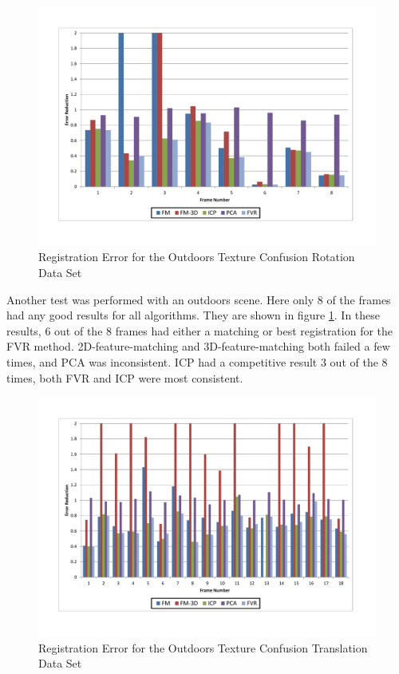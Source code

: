 \begin{figure}[t]
\centering
\includegraphics[width=6.0in]{images/results/Outside_TextureConfusion_Rotation}
\caption{Registration Error for the Outdoors Texture Confusion Rotation Data Set}
\label{fig:PET15}
\end{figure}

Another test was performed with an outdoors scene. Here only 8 of the frames had any good results for all algorithms. They are shown in figure \ref{fig:PET15}. In these results, 6 out of the 8 frames had either a matching or best registration for the FVR method. 2D-feature-matching and 3D-feature-matching both failed a few times, and PCA was inconsistent. ICP had a competitive result 3 out of the 8 times, both FVR and ICP were most consistent. 

\begin{figure}[t]
\centering
\includegraphics[width=6.0in]{images/results/Outside_TextureConfusion_Translation}
\caption{Registration Error for the Outdoors Texture Confusion Translation Data Set}
\label{fig:PET16}
\end{figure}

